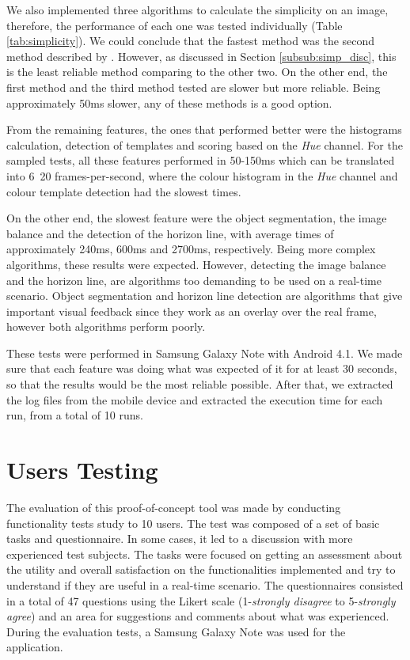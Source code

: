 We also implemented three algorithms to calculate the simplicity on an image, therefore, the performance of each one was tested individually (Table \ref{tab:simplicity}). We could conclude that the fastest method was the second method described by \citeauthor{kaoautomatic} \cite{kaoautomatic}. However, as discussed in Section \ref{subsub:simp_disc}, this is the least reliable method comparing to the other two. On the other end, the first method \cite{luo2008photo} and the third method \cite{ke2006design} tested are slower but more reliable. Being approximately 50ms slower, any of these methods is a good option.

From the remaining features, the ones that performed better were the histograms calculation, detection of templates and scoring based on the \emph{Hue} channel. For the sampled tests, all these features performed in 50-150ms which can be translated into 6~20 frames-per-second, where the colour histogram in the \emph{Hue} channel and colour template detection had the slowest times. 

On the other end, the slowest feature were the object segmentation, the image balance and the detection of the horizon line, with average times of approximately 240ms, 600ms and 2700ms, respectively. Being more complex algorithms, these results were expected. However, detecting the image balance and the horizon line, are algorithms too demanding to be used on a real-time scenario. Object segmentation and horizon line detection are algorithms that give important visual feedback since they work as an overlay over the real frame, however both algorithms perform poorly.

These tests were performed in Samsung Galaxy Note with Android 4.1. We made sure that each feature was doing what was expected of it for at least 30 seconds, so that the results would be the most reliable possible. After that, we extracted the log files from the mobile device and extracted the execution time for each run, from a total of 10 runs.
 
\section{Users Testing}

The evaluation of this proof-of-concept tool was made by conducting functionality tests study to 10 users. The test was composed of a set of basic tasks and questionnaire. In some cases, it led to a discussion with more experienced test subjects. The tasks were focused on getting an assessment about the utility and overall satisfaction on the functionalities implemented and try to understand if they are useful in a real-time scenario. The questionnaires consisted in a total of 47 questions using the Likert scale (1-\emph{strongly disagree} to 5-\emph{strongly agree}) and an area for suggestions and comments about what was experienced. During the evaluation tests, a Samsung Galaxy Note was used for the application.

